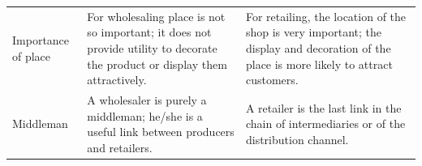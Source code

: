 \documentclass[11pt,]{book}
\theoremstyle{definition}
\theoremstyle{definition}
\theoremstyle{definition}
\theoremstyle{remark}
\begin{document}
\begin{table}[H]
\begin{tabular}[t]{>{\raggedright\arraybackslash}p{3.5cm}>{\raggedright\arraybackslash}p{5.25cm}>{\raggedright\arraybackslash}p{5.25cm}}
Importance of place & For wholesaling place is not so important; it does not provide utility to decorate the product or display them attractively. & For retailing, the location of the shop is very important; the display and decoration of the place is more likely to attract customers.\\
Middleman & A wholesaler is purely a middleman; he/she is a useful link between producers and retailers. & A retailer is the last link in the chain of intermediaries or of the distribution channel.\\
\bottomrule
\end{tabular}
\end{table}
\end{document}
